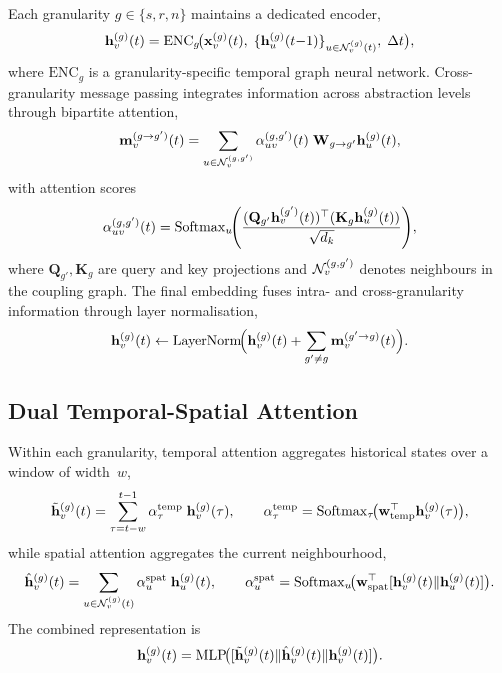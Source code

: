 Each granularity $g\in\{s,r,n\}$ maintains a dedicated encoder,
\begin{equation}
\mathbf{h}_v^{(g)}(t)
= \mathrm{ENC}_g\!\bigl(
  \mathbf{x}_v^{(g)}(t),\;
  \{\mathbf{h}_u^{(g)}(t{-}1)\}_{u\in\mathcal{N}_v^{(g)}(t)},\;
  \Delta t
\bigr),
\label{eq:triple_enc}
\end{equation}
where $\mathrm{ENC}_g$ is a granularity-specific temporal graph neural network. Cross-granularity message passing integrates information across abstraction levels through bipartite attention,
\begin{equation}
\mathbf{m}_v^{(g\to g')}(t)
= \sum_{u\in\mathcal{N}_v^{(g,g')}}
  \alpha_{uv}^{(g,g')}(t)\;\mathbf{W}_{g\to g'}\mathbf{h}_u^{(g)}(t),
\label{eq:triple_cross_msg}
\end{equation}
with attention scores
\begin{equation}
\alpha_{uv}^{(g,g')}(t)
= \mathrm{Softmax}_u\!\Biggl(
  \frac{(\mathbf{Q}_{g'}\mathbf{h}_v^{(g')}(t))^\top
        (\mathbf{K}_g\mathbf{h}_u^{(g)}(t))}
       {\sqrt{d_k}}
\Biggr),
\label{eq:triple_cross_attn}
\end{equation}
where $\mathbf{Q}_{g'},\mathbf{K}_g$ are query and key projections and $\mathcal{N}_v^{(g,g')}$ denotes neighbours in the coupling graph. The final embedding fuses intra- and cross-granularity information through layer normalisation,
\begin{equation}
\mathbf{h}_v^{(g)}(t)
\leftarrow
\mathrm{LayerNorm}\!\Bigl(
  \mathbf{h}_v^{(g)}(t)
  + \sum_{g'\neq g}\mathbf{m}_v^{(g'\to g)}(t)
\Bigr).
\label{eq:triple_fuse}
\end{equation}

\subsection{Dual Temporal-Spatial Attention}

Within each granularity, temporal attention aggregates historical states over a window of width~$w$,
\begin{equation}
\tilde{\mathbf{h}}_v^{(g)}(t)
= \sum_{\tau=t-w}^{t-1}
  \alpha_\tau^{\mathrm{temp}}\;\mathbf{h}_v^{(g)}(\tau),
\qquad
\alpha_\tau^{\mathrm{temp}}
= \mathrm{Softmax}_\tau\!\bigl(
  \mathbf{w}_{\mathrm{temp}}^\top\mathbf{h}_v^{(g)}(\tau)\bigr),
\label{eq:triple_temp_attn}
\end{equation}
while spatial attention aggregates the current neighbourhood,
\begin{equation}
\hat{\mathbf{h}}_v^{(g)}(t)
= \sum_{u\in\mathcal{N}_v^{(g)}(t)}
  \alpha_u^{\mathrm{spat}}\;\mathbf{h}_u^{(g)}(t),
\qquad
\alpha_u^{\mathrm{spat}}
= \mathrm{Softmax}_u\!\bigl(
  \mathbf{w}_{\mathrm{spat}}^\top
  [\mathbf{h}_v^{(g)}(t)\|\mathbf{h}_u^{(g)}(t)]\bigr).
\label{eq:triple_spat_attn}
\end{equation}
The combined representation is
\begin{equation}
\mathbf{h}_v^{(g)}(t)
= \mathrm{MLP}\!\bigl(
  [\tilde{\mathbf{h}}_v^{(g)}(t)\|
   \hat{\mathbf{h}}_v^{(g)}(t)\|
   \mathbf{h}_v^{(g)}(t)]
\bigr).
\label{eq:triple_combined}
\end{equation}

